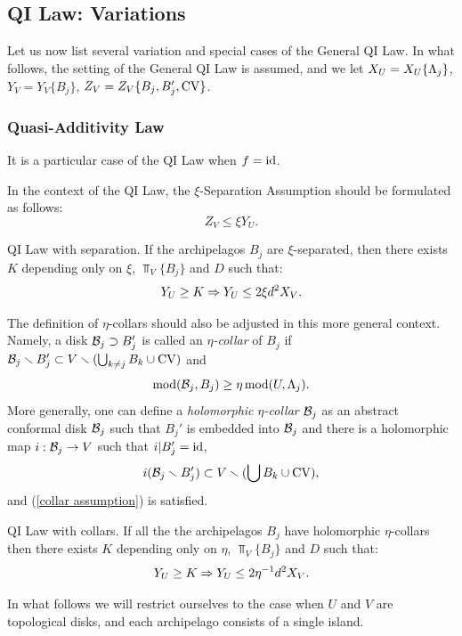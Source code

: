 \subsection{QI Law: Variations}\label{qi variations}
  Let us now list several variation and special cases of the General QI Law. 
In what follows, 
the setting of the General QI Law is assumed,  
and we let $X_U= X_U\{{\Lambda}_j\}$, $Y_V=Y_V\{B_j\}$, $Z_V= Z_V\{B_j, B_j', \mathrm{CV}\}$.  

\subsubsection{Quasi-Additivity Law} It is a particular case of the QI Law when $f=\operatorname{id}$.
    

In the context of the QI Law, the $\xi$-Separation Assumption should be formulated as follows:
$$
   Z_V  \leq \xi Y_U .
$$
  

\proclaim QI Law with separation.
If  the archipelagos $B_j$  are $\xi$-separated,
then there exists $K$ depending only on $\xi$, $\Top_V\{B_j\}$ and $D$ 
 such that:
 $$ Y_U  \geq K \Rightarrow  Y_U \leq 2 \xi d^2 X_V. $$ 


  The definition of  $\eta$-collars should  also be adjusted in this more general context.
Namely, a disk  ${\cal B}_j \supset B_j'$ is called an {\it $\eta$-collar } of
$B_j$ if ${\cal B}_j \smallsetminus B_j'\subset V\smallsetminus (\bigcup_{k\not=j} B_k\cup \mathrm{CV} )$ and
\begin{equation}\label{collar assumption}
   \operatorname{mod} ({\cal B}_j , B_j)\geq \eta \operatorname{mod} (U, {\Lambda}_j).
\end{equation}
More generally, one can define a {\it holomorphic $\eta$-collar} ${\cal B}_j$  as an abstract conformal disk
${\cal B}_j$ such that $B_j'$ is embedded into ${\cal B}_j$ and there is a holomorphic map
$i: {\cal B}_j\rightarrow V$ such that $i|B_j'=\operatorname{id}$,   
$$
   i({\cal B}_j\smallsetminus B_j')\subset V\smallsetminus (\bigcup B_k\cup \mathrm{CV}), 
$$ 
and (\ref{collar assumption}) is satisfied.


\proclaim QI Law with collars.
If all the the archipelagos $B_j$ have holomorphic $\eta$-collars then
there exists $K$ depending only on $\eta$,  $\Top_V\{B_j\}$ and $D$
 such that:
 $$ Y_U \geq K \Rightarrow Y_U  \leq 2 \eta^{-1} d^2 X_V . $$ 


In what follows  we will restrict ourselves to the case when $U$ and $V$ are topological disks,
and each archipelago consists of  a single island.

